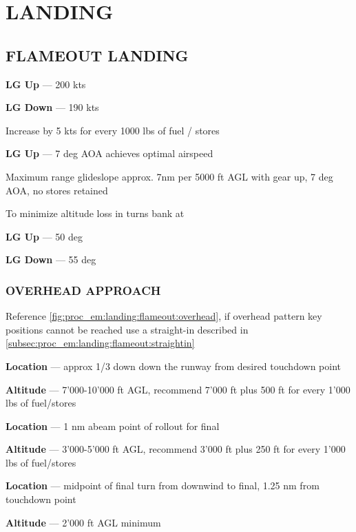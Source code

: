 \marginfigrestore

\clearpage

\section{LANDING}

\subsection{FLAMEOUT LANDING}
\label{subsec:proc_em:landing:flameout}


\begin{tcoloritemize}
    \textbf{LG Up} --- 200 kts
    
    \medskip
    \textbf{LG Down} --- 190 kts
    
    \bigskip
    Increase by 5 kts for every 1000 lbs of fuel / stores

    \textbf{LG Up} --- 7 deg AOA achieves optimal airspeed

    \blueitem[Glideslope] Maximum range glideslope
    approx. 7nm per 5000 ft AGL with gear up,
    7 deg AOA, no stores retained

    To minimize altitude loss in turns bank at
    
    \medskip
    \textbf{LG Up} --- 50 deg

    \medskip
    \textbf{LG Down} --- 55 deg
\end{tcoloritemize}

\subsubsection{OVERHEAD APPROACH}

\begin{tcoloritemize}
    Reference \cref{fig:proc_em:landing:flameout:overhead}, 
    if overhead pattern key positions cannot be reached use a straight-in 
    described in \cref{subsec:proc_em:landing:flameout:straightin}

    \textbf{Location} --- approx {1/3 down down the runway} from desired touchdown point

    \bigskip
    \textbf{Altitude} --- {7'000-10'000 ft AGL},
    recommend 7'000 ft plus 500 ft for every 1'000 lbs of fuel/stores

    \textbf{Location} --- {1 nm abeam} point of rollout for final 

    \bigskip
    \textbf{Altitude} --- {3'000-5'000 ft AGL},
    recommend 3'000 ft plus 250 ft for every 1'000 lbs of fuel/stores

    \textbf{Location} --- midpoint of final turn from downwind to final,
    {1.25 nm from touchdown point}

    \bigskip
    \textbf{Altitude} --- {2'000 ft AGL minimum}
\end{tcoloritemize}

